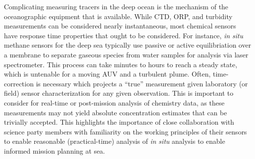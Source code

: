 Complicating measuring tracers in the deep ocean is the mechanism of the oceanographic equipment that is available. While CTD, ORP, and turbidity measurements can be considered nearly instantaneous, most chemical sensors have response time properties that ought to be considered. For instance, \emph{in situ} methane sensors for the deep sea typically use passive or active equilibriation over a membrane to separate gaseous species from water samples for analysis via laser spectrometer. This process can take minutes to hours to reach a steady state, which is untenable for a moving AUV and a turbulent plume. Often, time-correction is necessary\autocite{bittig2018oxygen} which projects a ``true'' measurement given laboratory (or field) sensor characterization for any given observation. This is important to consider for real-time or post-mission analysis of chemistry data, as these measurements may not yield absolute concentration estimates that can be trivially accepted. This highlights the importance of close collaboration with science party members with familiarity on the working principles of their sensors to enable reasonable (practical-time) analysis of \emph{in situ} analysis to enable informed mission planning at sea. 



